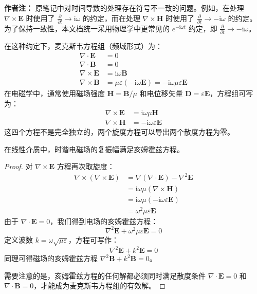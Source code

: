 \documentclass[fontset=none]{ctexart}
\begin{document}
\textbf{作者注：} 原笔记中对时间导数的处理存在符号不一致的问题。例如，在处理 $\nabla \times \bm{E}$ 时使用了 $\frac{\partial}{\partial t} \to \mathrm{i}\omega$ 的约定，而在处理 $\nabla \times \bm{H}$ 时使用了 $\frac{\partial}{\partial t} \to -\mathrm{i}\omega$ 的约定。为了保持一致性，本文档统一采用物理学中更常见的 $e^{-\mathrm{i}\omega t}$ 约定，即 $\frac{\partial}{\partial t} \to -\mathrm{i}\omega$。

在这种约定下，麦克斯韦方程组（频域形式）为：
\begin{equation}
\begin{aligned}
\nabla \cdot \bm{E} &= 0 \\
\nabla \cdot \bm{B} &= 0 \\
\nabla \times \bm{E} &= \mathrm{i}\omega \bm{B} \\
\nabla \times \bm{B} &= \mu\varepsilon(-\mathrm{i}\omega \bm{E}) = -\mathrm{i}\omega\mu\varepsilon\bm{E}
\end{aligned}
\end{equation}
在电磁学中，通常使用磁场强度 $\bm{H} = \bm{B}/\mu$ 和电位移矢量 $\bm{D} = \varepsilon\bm{E}$，方程组可写为：
\begin{equation}
\begin{aligned}
\nabla \times \bm{E} &= \mathrm{i}\omega\mu\bm{H} \\
\nabla \times \bm{H} &= -\mathrm{i}\omega\varepsilon\bm{E}
\end{aligned}
\end{equation}
这四个方程不是完全独立的，两个旋度方程可以导出两个散度方程为零。

\begin{theorem}[亥姆霍兹方程]
在线性介质中，时谐电磁场的复振幅满足亥姆霍兹方程。
\end{theorem}
\begin{proof}
对 $\nabla \times \bm{E}$ 方程再次取旋度：
\begin{equation}
\begin{aligned}
\nabla \times (\nabla \times \bm{E}) &= \nabla(\nabla \cdot \bm{E}) - \nabla^2 \bm{E} \\
&= \mathrm{i}\omega\mu (\nabla \times \bm{H}) \\
&= \mathrm{i}\omega\mu (-\mathrm{i}\omega\varepsilon\bm{E}) \\
&= \omega^2\mu\varepsilon\bm{E}
\end{aligned}
\end{equation}
由于 $\nabla \cdot \bm{E} = 0$，我们得到电场的亥姆霍兹方程：
\begin{equation}
\nabla^2 \bm{E} + \omega^2\mu\varepsilon \bm{E} = 0
\end{equation}
定义波数 $k = \omega\sqrt{\mu\varepsilon}$，方程可写作：
\begin{equation}
\nabla^2 \bm{E} + k^2 \bm{E} = 0
\end{equation}
同理可得磁场的亥姆霍兹方程 $\nabla^2 \bm{B} + k^2 \bm{B} = 0$。

需要注意的是，亥姆霍兹方程的任何解都必须同时满足散度条件 $\nabla \cdot \bm{E} = 0$ 和 $\nabla \cdot \bm{B} = 0$，才能成为麦克斯韦方程组的有效解。
\end{proof}
\end{document}
